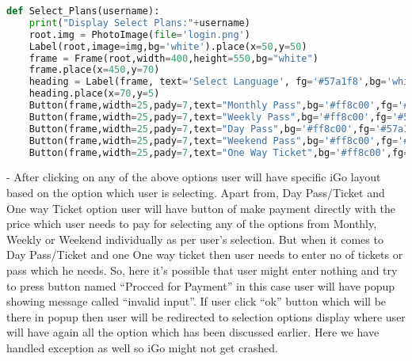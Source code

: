 \documentclass[a4paper,12pt]{report}
\begin{document}
\begin{enumerate}
\begin{lstlisting}[language=Python]
def Select_Plans(username):
    print("Display Select Plans:"+username)
    root.img = PhotoImage(file='login.png')
    Label(root,image=img,bg='white').place(x=50,y=50)
    frame = Frame(root,width=400,height=550,bg="white")
    frame.place(x=450,y=70)
    heading = Label(frame, text='Select Language', fg='#57a1f8',bg='white',font=('Microsoft YaHei UI Light',23,'bold'))
    heading.place(x=70,y=5)
    Button(frame,width=25,pady=7,text="Monthly Pass",bg='#ff8c00',fg='#57a1f8',font=('Microsoft YaHei UI Light',15,'bold','italic'),border=0,highlightbackground="#ff8c00",command=lambda: Monthly_pass(username)).place(x=25,y=107)
    Button(frame,width=25,pady=7,text="Weekly Pass",bg='#ff8c00',fg='#57a1f8',font=('Microsoft YaHei UI Light',15,'bold','italic'),border=0,highlightbackground="#ff8c00",command=lambda: Weekly_pass(username)).place(x=30,y=170)
    Button(frame,width=25,pady=7,text="Day Pass",bg='#ff8c00',fg='#57a1f8',font=('Microsoft YaHei UI Light',15,'bold','italic'),border=0,highlightbackground="#ff8c00",command=lambda: Day_pass(username)).place(x=35,y=233)
    Button(frame,width=25,pady=7,text="Weekend Pass",bg='#ff8c00',fg='#57a1f8',font=('Microsoft YaHei UI Light',15,'bold','italic'),border=0,highlightbackground="#ff8c00",command=lambda: Weekend_pass(username)).place(x=40,y=296)
    Button(frame,width=25,pady=7,text="One Way Ticket",bg='#ff8c00',fg='#57a1f8',font=('Microsoft YaHei UI Light',15,'bold','italic'),border=0,highlightbackground="#ff8c00",command=lambda: One_way_pass(username)).place(x=45,y=359)
\end{lstlisting}
- After clicking on any of the above options user will have specific iGo layout based on the option which user is selecting. Apart from, Day Pass/Ticket and One way Ticket option user will have button of make payment directly with the price which user needs to pay for selecting any of the options from Monthly, Weekly or Weekend individually as per user’s selection. But when it comes to Day Pass/Ticket and one  One way ticket then user needs to enter no of tickets or pass which he needs. So, here it’s possible that user might enter nothing and try to press button named “Procced for Payment” in this case user will have popup showing message called “invalid input”. If user click “ok” button which will be there in popup then user will be redirected to selection options display where user will have again all the option which has been discussed earlier. Here we have handled exception as well so iGo might not get crashed.\\

\end{enumerate}
\end{document}

